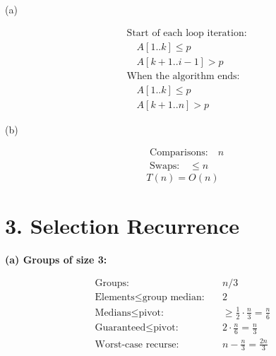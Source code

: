 \documentclass[11pt]{article}
\begin{document}
\noindent
\begin{minipage}[t]{0.04\textwidth}
\vspace{0pt}
(a)
\end{minipage}%
\begin{minipage}[t]{0.50\textwidth}
\vspace{0pt}
\begin{algorithm}[H]
\DontPrintSemicolon
{}
\end{algorithm}
\end{minipage}%
\begin{minipage}[t]{0.46\textwidth}
\vspace{0pt}
\begin{align*}
&\text{Start of each loop iteration:} \\
&\quad A[1..k] \le p \\
&\quad A[k+1..i-1] > p \\[1em]
&\text{When the algorithm ends:} \\
&\quad A[1..k] \le p \\
&\quad A[k+1..n] > p
\end{align*}
\end{minipage}

\vspace{1em}

\noindent
\begin{minipage}[t]{0.04\textwidth}
\vspace{0pt}
(b)
\end{minipage}%
\begin{minipage}[t]{0.96\textwidth}
\vspace{0pt}
\begin{align*}
&\text{Comparisons:} \quad n \\
&\text{Swaps:} \quad \le n
\end{align*}
\[
\boxed{T(n) = O(n)}
\]
\end{minipage}


\section*{3. Selection Recurrence}

\textbf{(a) Groups of size 3:}

\begin{align*}
\text{Groups:} \quad & n/3 \\
\text{Elements} \le \text{group median:} \quad & 2 \\
\text{Medians} \le \text{pivot:} \quad & \ge \frac{1}{2} \cdot \frac{n}{3} = \frac{n}{6} \\
\text{Guaranteed} \le \text{pivot:} \quad & 2 \cdot \frac{n}{6} = \frac{n}{3} \\
\text{Worst-case recurse:} \quad & n - \frac{n}{3} = \frac{2n}{3}
\end{align*}
\end{document}
